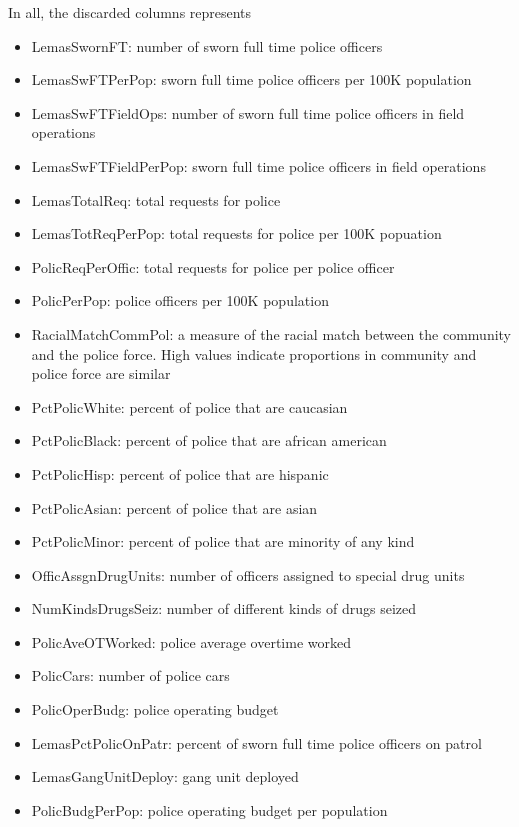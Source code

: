 \documentclass{article}
\begin{document}
In all, the discarded columns represents
\begin{itemize}
    \item LemasSwornFT: number of sworn full time police officers
    \item LemasSwFTPerPop: sworn full time police officers per 100K population
    \item LemasSwFTFieldOps: number of sworn full time police officers in field operations
    \item LemasSwFTFieldPerPop: sworn full time police officers in field operations
    \item LemasTotalReq: total requests for police
    \item LemasTotReqPerPop: total requests for police per 100K popuation
    \item PolicReqPerOffic: total requests for police per police officer
    \item PolicPerPop: police officers per 100K population
    \item RacialMatchCommPol: a measure of the racial match between the community and the police force. High values indicate proportions in community and police force are similar
    \item PctPolicWhite: percent of police that are caucasian
    \item PctPolicBlack: percent of police that are african american
    \item PctPolicHisp: percent of police that are hispanic
    \item PctPolicAsian: percent of police that are asian
    \item PctPolicMinor: percent of police that are minority of any kind
    \item OfficAssgnDrugUnits: number of officers assigned to special drug units
    \item NumKindsDrugsSeiz: number of different kinds of drugs seized
    \item PolicAveOTWorked: police average overtime worked
    \item PolicCars: number of police cars 
    \item PolicOperBudg: police operating budget
    \item LemasPctPolicOnPatr: percent of sworn full time police officers on patrol
    \item LemasGangUnitDeploy: gang unit deployed
    \item PolicBudgPerPop: police operating budget per population
\end{itemize}
\end{document}
